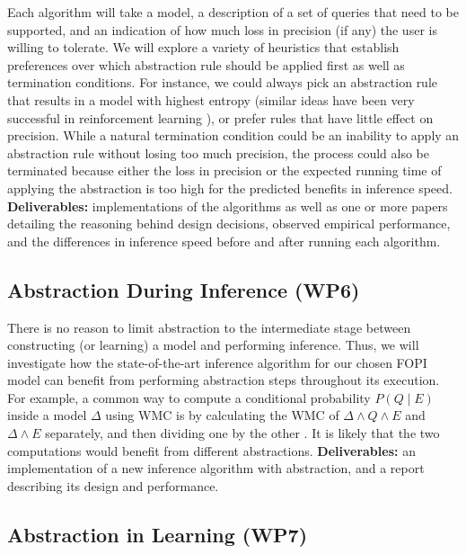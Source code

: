 \documentclass{article}
\begin{document}
Each algorithm will take a model, a description of a set of queries that need to
be supported, and an indication of how much loss in precision (if any) the user
is willing to tolerate. We will explore a variety of heuristics that establish
preferences over which abstraction rule should be applied first as well as
termination conditions. For instance, we could always pick an abstraction rule
that results in a model with highest entropy (similar ideas have been very
successful in reinforcement learning \cite{DBLP:conf/aaai/ZiebartMBD08}), or
prefer rules that have little effect on precision. While a natural termination
condition could be an inability to apply an abstraction rule without losing too
much precision, the process could also be terminated because either the loss in
precision or the expected running time of applying the abstraction is too high
for the predicted benefits in inference speed. \textbf{Deliverables:}
implementations of the algorithms as well as one or more papers detailing the
reasoning behind design decisions, observed empirical performance, and the
differences in inference speed before and after running each algorithm.

\subsection{Abstraction During Inference (WP6)}

There is no reason to limit abstraction to the intermediate stage between
constructing (or learning) a model and performing inference. Thus, we will
investigate how the state-of-the-art inference algorithm for our chosen FOPI
model can benefit from performing abstraction steps throughout its execution.
For example, a common way to compute a conditional probability $P(Q \mid E)$
inside a model $\Delta$ using WMC is by calculating the WMC of $\Delta \land Q
\land E$ and $\Delta \land E$ separately, and then dividing one by the other
\cite{DBLP:journals/ai/ChaviraD08}. It is likely that the two computations would
benefit from different abstractions. \textbf{Deliverables:} an implementation of a
new inference algorithm with abstraction, and a report describing its design and
performance.

\subsection{Abstraction in Learning (WP7)}
\end{document}
